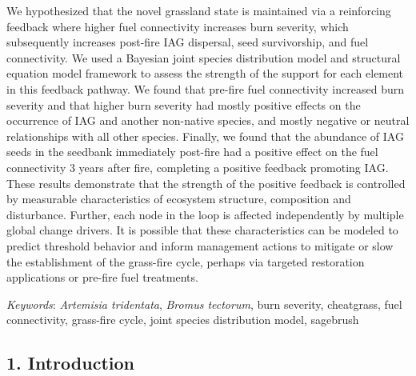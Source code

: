 \documentclass[
  12pt,
]{article}
\begin{document}
We hypothesized that the novel grassland state is maintained via a
reinforcing feedback where higher fuel connectivity increases burn
severity, which subsequently increases post-fire IAG dispersal, seed
survivorship, and fuel connectivity. We used a Bayesian joint species
distribution model and structural equation model framework to assess the
strength of the support for each element in this feedback pathway. We
found that pre-fire fuel connectivity increased burn severity and that
higher burn severity had mostly positive effects on the occurrence of
IAG and another non-native species, and mostly negative or neutral
relationships with all other species. Finally, we found that the
abundance of IAG seeds in the seedbank immediately post-fire had a
positive effect on the fuel connectivity 3 years after fire, completing
a positive feedback promoting IAG. These results demonstrate that the
strength of the positive feedback is controlled by measurable
characteristics of ecosystem structure, composition and disturbance.
Further, each node in the loop is affected independently by multiple
global change drivers. It is possible that these characteristics can be
modeled to predict threshold behavior and inform management actions to
mitigate or slow the establishment of the grass-fire cycle, perhaps via
targeted restoration applications or pre-fire fuel treatments.

\emph{Keywords}: \emph{Artemisia tridentata}, \emph{Bromus tectorum},
burn severity, cheatgrass, fuel connectivity, grass-fire cycle, joint
species distribution model, sagebrush

\hypertarget{introduction}{%
\subsection{1. Introduction}\label{introduction}}
\end{document}
